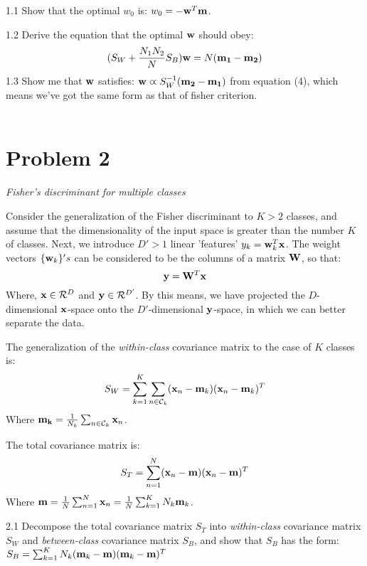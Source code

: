 \documentclass{article}
\theoremstyle{definition}
\theoremstyle{definition}
\theoremstyle{remark}
\begin{document}
1.1 Show that the optimal $w_{0}$ is: $w_{0}=-\bold{w}^{T}\bold{m}$.

1.2 Derive the equation that the optimal $\bold{w}$ should obey:
\begin{eqnarray}
(S_{W}+\frac{N_{1}N_{2}}{N}S_{B})\bold{w}=N(\bold{m_{1}}-\bold{m_{2}})
\end{eqnarray}
1.3 Show me that $\bold{w}$ satisfies: $\bold{w}\varpropto S_{W}^{-1}(\bold{m_{2}}-\bold{m_{1}})$ from equation (4), which means we've got the same form as that of fisher criterion.
\\
\\
\section*{Problem 2}\label{problem:2}
\emph{Fisher's discriminant for multiple classes}

Consider the generalization of the Fisher discriminant to $K>2$ classes, and assume that the dimensionality of the input space is greater than the number $K$ of classes. Next, we introduce $D'>1$ linear 'features' $y_{k}=\bold{w}_{k}^{T}\bold{x}$. The weight vectors $\{\bold{w}_{k}\}'s$ can be considered to be the columns of a matrix $\bold{W}$, so that:
\[
\bold{y}=\bold{W}^{T}\bold{x}
\]
Where, $\bold{x}\in \mathcal{R}^{D}$ and $\bold{y} \in \mathcal{R}^{D'}$. By this means, we have projected the $D$-dimensional $\bold{x}$-space onto the $D'$-dimensional $\bold{y}$-space, in which we can better separate the data.

The generalization of the \emph{within-class} covariance matrix to the case of $K$ classes is:
\begin{eqnarray}
S_{W}=\sum_{k=1}^{K}\sum_{n\in \mathcal{C}_{k}}(\bold{x}_{n}-\bold{m}_{k})(\bold{x}_{n}-\bold{m}_{k})^{T}
\end{eqnarray}
Where $\bold{m_{k}}=\frac{1}{N_{k}}\sum_{n\in \mathcal{C}_{k}}\bold{x}_{n}$.

The total covariance matrix is:
\begin{eqnarray}
S_{T}=\sum_{n=1}^{N}(\bold{x}_{n}-\bold{m})(\bold{x}_{n}-\bold{m})^{T}
\end{eqnarray}
Where $\bold{m}=\frac{1}{N}\sum_{n=1}^{N}\bold{x}_{n}=\frac{1}{N}\sum_{k=1}^{K}N_{k}\bold{m}_{k}$.

2.1 Decompose the total covariance matrix $S_{T}$ into \emph{within-class} covariance matrix $S_{W}$ and \emph{between-class} covariance matrix $S_{B}$, and show that $S_{B}$ has the form: $S_{B}=\sum_{k=1}^{K}N_{k}(\bold{m}_{k}-\bold{m})(\bold{m}_{k}-\bold{m})^{T}$
\end{document}
